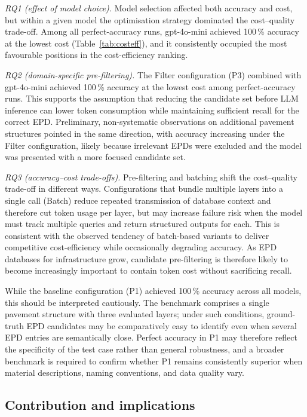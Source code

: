 \documentclass[10pt, a4paper, twocolumn]{article}
\begin{document}
\textit{RQ1 (effect of model choice).} Model selection affected both accuracy and
cost, but within a given model the optimisation strategy dominated the
cost--quality trade-off. Among all perfect-accuracy runs, gpt-4o-mini achieved
100\,\% accuracy at the lowest cost (Table~\ref{tab:costeff}), and it consistently
occupied the most favourable positions in the cost-efficiency ranking.

\textit{RQ2 (domain-specific pre-filtering).} The Filter configuration (P3)
combined with gpt-4o-mini achieved 100\,\% accuracy at the lowest cost among
perfect-accuracy runs. This supports the assumption that reducing the candidate
set before LLM inference can lower token consumption while maintaining sufficient
recall for the correct EPD. Preliminary, non-systematic observations on additional
pavement structures pointed in the same direction, with accuracy increasing under
the Filter configuration, likely because irrelevant EPDs were excluded and the
model was presented with a more focused candidate set.

\textit{RQ3 (accuracy--cost trade-offs).} Pre-filtering and batching shift the
cost--quality trade-off in different ways. Configurations that bundle multiple
layers into a single call (Batch) reduce repeated transmission of database context
and therefore cut token usage per layer, but may increase failure risk when the
model must track multiple queries and return structured outputs for each. This is
consistent with the observed tendency of batch-based variants to deliver
competitive cost-efficiency while occasionally degrading accuracy. As EPD databases
for infrastructure grow, candidate pre-filtering is therefore likely to become
increasingly important to contain token cost without sacrificing recall.

While the baseline configuration (P1) achieved 100\,\% accuracy across all models,
this should be interpreted cautiously. The benchmark comprises a single pavement
structure with three evaluated layers; under such conditions, ground-truth EPD
candidates may be comparatively easy to identify even when several EPD entries are
semantically close. Perfect accuracy in P1 may therefore reflect the specificity of
the test case rather than general robustness, and a broader benchmark is required to
confirm whether P1 remains consistently superior when material descriptions, naming
conventions, and data quality vary.

\subsection{Contribution and implications}
\end{document}

